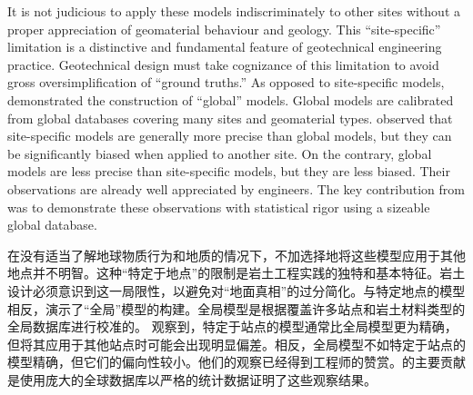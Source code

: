 \begin{paracol}{2}
    \switchcolumn*

    It is not judicious to apply these models indiscriminately to other sites without a proper appreciation of geomaterial behaviour and geology. This “site-specific” limitation is a distinctive and fundamental feature of geotechnical engineering practice. Geotechnical design must take cognizance of this limitation to avoid gross oversimplification of “ground truths.” As opposed to site-specific models, \citet{Ching201252} demonstrated the construction of “global” models. Global models are calibrated from global databases covering many sites and geomaterial types. \citet{Ching201252} observed that site-specific models are generally more precise than global models, but they can be significantly biased when applied to another site. On the contrary, global models are less precise than site-specific models, but they are less biased. Their observations are already well appreciated by engineers. The key contribution from \citet{Ching201252} was to demonstrate these observations with statistical rigor using a sizeable global database.

    \switchcolumn

    在没有适当了解地球物质行为和地质的情况下，不加选择地将这些模型应用于其他地点并不明智。这种“特定于地点”的限制是岩土工程实践的独特和基本特征。岩土设计必须意识到这一局限性，以避免对“地面真相”的过分简化。与特定地点的模型相反，\citet{Ching201252}演示了“全局”模型的构建。全局模型是根据覆盖许多站点和岩土材料类型的全局数据库进行校准的。 \citet{Ching201252}观察到，特定于站点的模型通常比全局模型更为精确，但将其应用于其他站点时可能会出现明显偏差。相反，全局模型不如特定于站点的模型精确，但它们的偏向性较小。他们的观察已经得到工程师的赞赏。\citet{Ching201252}的主要贡献是使用庞大的全球数据库以严格的统计数据证明了这些观察结果。

    \switchcolumn*


\end{paracol}
